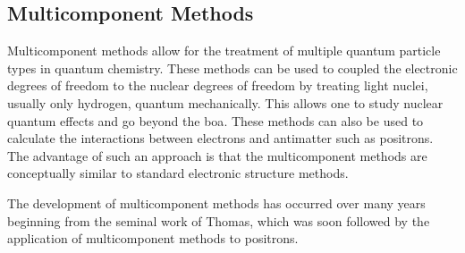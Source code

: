 \subsection{Multicomponent Methods}
Multicomponent methods allow for the treatment of multiple quantum particle types in quantum chemistry.
These methods can be used to coupled the electronic degrees of freedom to the nuclear degrees of freedom by treating light nuclei, usually only hydrogen, quantum mechanically.
This allows one to study nuclear quantum effects and go beyond the \gls{boa}.
These methods can also be used to calculate the interactions between electrons and antimatter such as positrons.
The advantage of such an approach is that the multicomponent methods are conceptually similar to standard electronic structure methods.

The development of multicomponent methods has occurred over many years beginning from the seminal work of Thomas,\cite{10.1103/PhysRev.185.90, 10.1016/0009-26146987015-6, 10.1103/PhysRevA.2.1200,10.1103/PhysRevA.3.565} which was soon followed by the application of multicomponent methods to positrons.\cite{10.1088/0022-3700/11/16/001, 10.1088/0022-3700/12/15/007,10.1063/1.438933,10.1063/1.442211,10.1088/0022-3700/14/22/019}
